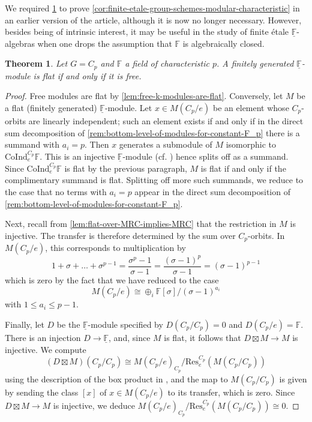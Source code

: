 \documentclass[11pt,dvipsnames]{amsart}
\newcommand{\F}{\mathbb{F}}
\newtheorem{theorem}{Theorem}[section]
\theoremstyle{BoldRemark}
\newcommand{\Res}{\mathrm{Res}}
\newcommand{\Coind}{\mathrm{CoInd}}
\begin{document}
We required \cref{thm:flat-implies-free-for-constant-F_p} to prove \cref{cor:finite-etale-group-schemes-modular-characteristic} in an earlier version of the article, although it is now no longer necessary. However, besides being of intrinsic interest, it may be useful in the study of finite \'{e}tale $\underline{\F}$-algebras when one drops the assumption that $\F$ is algebraically closed.

\begin{theorem}\label{thm:flat-implies-free-for-constant-F_p}
    Let $G = C_p$ and $\F$ a field of characteristic $p$. A finitely generated $\underline{\F}$-module is flat if and only if it is free.
\end{theorem}

\begin{proof}
    Free modules are flat by \cref{lem:free-k-modules-are-flat}. Conversely, let $M$ be a flat (finitely generated) $\underline{\F}$-module. Let $x \in M(C_p/e)$ be an element whose $C_p$-orbits are linearly independent; such an element exists if and only if in the direct sum decomposition of \cref{rem:bottom-level-of-modules-for-constant-F_p} there is a summand with $a_i = p$. Then $x$ generates a submodule of $M$ isomorphic to $\Coind_e^{C_p} \F$. This is an injective $\underline{\F}$-module (cf. \cite[Lemma 4.8]{CW25}) hence splits off as a summand. Since $\Coind_e^{C_p} \F$ is flat by the previous paragraph, $M$ is flat if and only if the complimentary summand is flat. Splitting off more such summands, we reduce to the case that no terms with $a_i = p$ appear in the direct sum decomposition of \cref{rem:bottom-level-of-modules-for-constant-F_p}.

    Next, recall from \cref{lem:flat-over-MRC-implies-MRC} that the restriction in $M$ is injective. The transfer is therefore determined by the sum over $C_p$-orbits. In $M(C_p/e)$, this corresponds to multiplication by 
    \[ 
        1+\sigma+\dots+\sigma^{p-1} = \frac{\sigma^p-1}{\sigma-1} = \frac{(\sigma-1)^p}{\sigma-1} = (\sigma-1)^{p-1} 
    \] 
    which is zero by the fact that we have reduced to the case 
    \[ 
        M(C_p/e) \cong \oplus_i \F[\sigma]/(\sigma-1)^{a_i} 
    \] 
    with $1 \leq a_i \leq p-1$. 

    Finally, let $D$ be the $\underline{\F}$-module specified by $D(C_p/C_p) = 0$ and $D(C_p/e) = \F$. There is an injection $D \rightarrow \underline{\F}$, and, since $M$ is flat, it follows that $D \boxtimes M \rightarrow M$ is injective. We compute 
    \[ 
        (D \boxtimes M)(C_p/C_p) \cong M(C_p/e)_{C_p}/\Res_e^{C_p}(M(C_p/C_p)) 
    \] 
    using the description of the box product in \cite{Maz13}, and the map to $M(C_p/C_p)$ is given by sending the class $[x]$ of $x \in M(C_p/e)$ to its transfer, which is zero. Since $D \boxtimes M \rightarrow M$ is injective, we deduce $M(C_p/e)_{C_p} / \Res_e^{C_p}(M(C_p/C_p)) \cong 0$. 


\end{proof}
\end{document}
